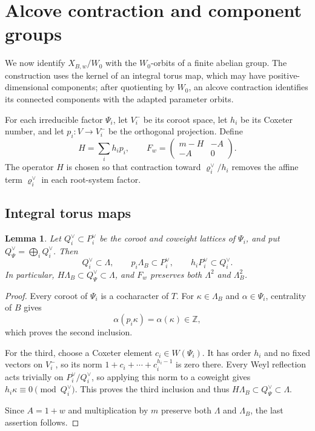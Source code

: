 \documentclass[11pt,a4paper,reqno]{amsart}
\theoremstyle{plain}
\newtheorem{lemma}[theorem]{Lemma}
\theoremstyle{definition}
\theoremstyle{remark}
\numberwithin{equation}{section}
\newcommand{\ZZ}{\mathbb Z}
\newcommand{\rh}{\varrho^\vee}
\begin{document}
\section{Alcove contraction and component groups}\label{sec:contraction}

We now identify $X_{B,w}/W_0$ with the $W_0$-orbits of a finite abelian group. The construction uses the kernel of an integral torus map, which may have positive-dimensional components; after quotienting by $W_0$, an alcove contraction identifies its connected components with the adapted parameter orbits.

For each irreducible factor $\Psi_i$, let $V_i^-$ be its coroot space, let $h_i$ be its Coxeter number, and let $p_i\colon V\to V_i^-$ be the orthogonal projection. Define
\begin{equation}\label{eq:F}
H=\sum_i h_i p_i,\qquad F_w=\begin{pmatrix}m-H&-A\\-A&0\end{pmatrix}.
\end{equation}
The operator $H$ is chosen so that contraction toward $\rh_i/h_i$ removes the affine term $\rh_i$ in each root-system factor.

\subsection{Integral torus maps}

\begin{lemma}\label{lem:integrality} Let $Q_i^\vee\subset P_i^\vee$ be the coroot and coweight lattices of $\Psi_i$, and put $Q_\Psi^\vee=\bigoplus_i Q_i^\vee$. Then
\begin{equation}\label{eq:integrality}
Q_i^\vee\subset\Lambda,\qquad p_i\Lambda_B\subset P_i^\vee,\qquad h_iP_i^\vee\subset Q_i^\vee.
\end{equation}
In particular, $H\Lambda_B\subset Q_\Psi^\vee\subset\Lambda$, and $F_w$ preserves both $\Lambda^2$ and $\Lambda_B^2$.
\end{lemma}
\begin{proof}
Every coroot of $\Psi_i$ is a cocharacter of $T$. For $\kappa\in\Lambda_B$ and $\alpha\in\Psi_i$, centrality of $B$ gives
\[
\alpha(p_i\kappa)=\alpha(\kappa)\in\ZZ,
\]
which proves the second inclusion.

For the third, choose a Coxeter element $c_i\in W(\Psi_i)$. It has order $h_i$ and no fixed vectors on $V_i^-$, so its norm $1+c_i+\cdots+c_i^{h_i-1}$ is zero there. Every Weyl reflection acts trivially on $P_i^\vee/Q_i^\vee$, so applying this norm to a coweight gives $h_i\kappa\equiv0\pmod{Q_i^\vee}$. This proves the third inclusion and thus $H\Lambda_B\subset Q_\Psi^\vee\subset\Lambda$.

Since $A=1+w$ and multiplication by $m$ preserve both $\Lambda$ and $\Lambda_B$, the last assertion follows.
\end{proof}
\end{document}
